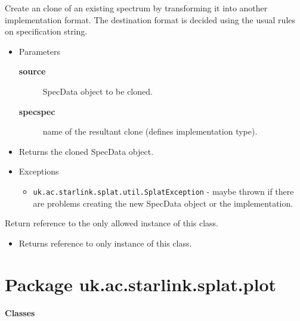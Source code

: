 \begin{desc}Create an clone of an existing spectrum by transforming it into
 another implementation format. The destination format is
 decided using the usual rules on specification string.
\begin{itemize}
\item{Parameters
  \begin{description}
   \item[\textbf{source}]{SpecData object to be cloned.}
   \item[\textbf{specspec}]{name of the resultant clone (defines
                 implementation type).}
  \end{description}}
\end{itemize}
\begin{itemize}
\item{Returns the cloned SpecData object. }
\item{{Exceptions}
  \begin{itemize}
   \item{\vspace{-.6ex}\texttt{uk.ac.starlink.splat.util.SplatException} - maybe thrown if there are problems
            creating the new SpecData object or the implementation.}
  \end{itemize}
}
\end{itemize}
\end{desc}

\begin{desc}Return reference to the only allowed instance of this class.
\begin{itemize}
\item{Returns reference to only instance of this class. }
\end{itemize}
\end{desc}

\clearpage


\section{Package uk.ac.starlink.splat.plot}

\vspace{.13in}
\hbox{\textbf{Classes}}
\vspace{.13in}
\clearpage
